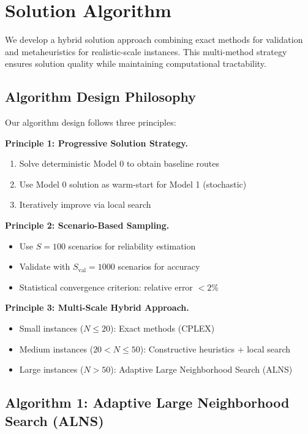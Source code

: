 \section{Solution Algorithm}
\label{sec:solution_algorithm}

We develop a hybrid solution approach combining exact methods for validation and metaheuristics for realistic-scale instances. This multi-method strategy ensures solution quality while maintaining computational tractability.

\subsection{Algorithm Design Philosophy}

Our algorithm design follows three principles:

\textbf{Principle 1: Progressive Solution Strategy.}
\begin{enumerate}
\item Solve deterministic Model 0 to obtain baseline routes
\item Use Model 0 solution as warm-start for Model 1 (stochastic)
\item Iteratively improve via local search
\end{enumerate}

\textbf{Principle 2: Scenario-Based Sampling.}
\begin{itemize}
\item Use $S = 100$ scenarios for reliability estimation
\item Validate with $S_{\text{val}} = 1000$ scenarios for accuracy
\item Statistical convergence criterion: relative error $< 2\%$
\end{itemize}

\textbf{Principle 3: Multi-Scale Hybrid Approach.}
\begin{itemize}
\item Small instances ($N \leq 20$): Exact methods (CPLEX)
\item Medium instances ($20 < N \leq 50$): Constructive heuristics + local search
\item Large instances ($N > 50$): Adaptive Large Neighborhood Search (ALNS)
\end{itemize}

\subsection{Algorithm 1: Adaptive Large Neighborhood Search (ALNS)}

